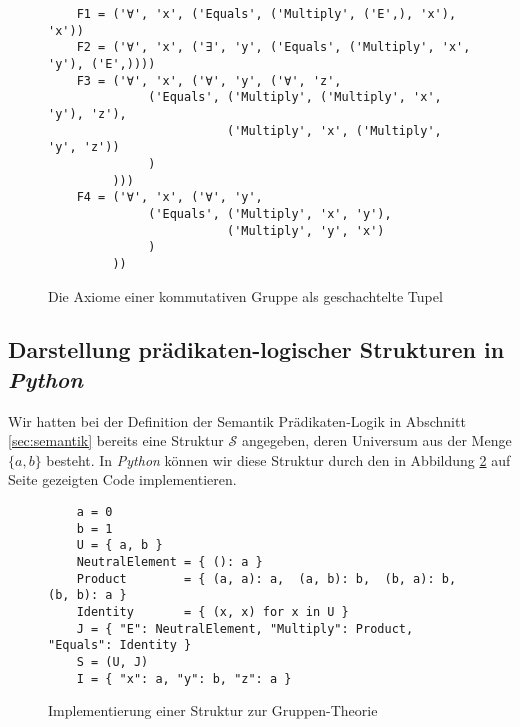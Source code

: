 \begin{figure}[!ht]
\centering
\begin{verbatim}
    F1 = ('∀', 'x', ('Equals', ('Multiply', ('E',), 'x'), 'x'))
    F2 = ('∀', 'x', ('∃', 'y', ('Equals', ('Multiply', 'x', 'y'), ('E',))))
    F3 = ('∀', 'x', ('∀', 'y', ('∀', 'z',
              ('Equals', ('Multiply', ('Multiply', 'x', 'y'), 'z'),
                         ('Multiply', 'x', ('Multiply', 'y', 'z'))
              )
         )))
    F4 = ('∀', 'x', ('∀', 'y',
              ('Equals', ('Multiply', 'x', 'y'),
                         ('Multiply', 'y', 'x')
              )
         ))        
\end{verbatim}
\vspace*{-0.3cm}
\caption{Die Axiome einer kommutativen Gruppe als geschachtelte Tupel}
\label{fig:group-theory-tupel}
\end{figure}

\subsection{Darstellung prädikaten-logischer Strukturen in \textsl{Python}}
Wir hatten bei der Definition der Semantik Prädikaten-Logik in Abschnitt \ref{sec:semantik} bereits eine
Struktur $\mathcal{S}$ angegeben, deren Universum aus der Menge $\{ a, b \}$ besteht.  In \textsl{Python}
können wir diese Struktur durch den in Abbildung \ref{fig:Group.ipynb} auf Seite \pageref{fig:Group.ipynb}
gezeigten Code implementieren. 

\begin{figure}[!ht]
\centering
\begin{verbatim}
    a = 0
    b = 1
    U = { a, b }  
    NeutralElement = { (): a }
    Product        = { (a, a): a,  (a, b): b,  (b, a): b,  (b, b): a }
    Identity       = { (x, x) for x in U }
    J = { "E": NeutralElement, "Multiply": Product, "Equals": Identity }
    S = (U, J)
    I = { "x": a, "y": b, "z": a }
\end{verbatim}
\vspace*{-0.3cm}
\caption{Implementierung einer Struktur zur Gruppen-Theorie}
\label{fig:Group.ipynb}
\end{figure}

